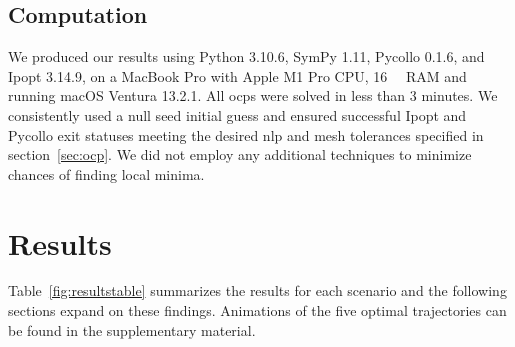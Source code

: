 \documentclass[default,iicol]{sn-jnl}
\begin{document}
\subsection{Computation}
We produced our results using Python 3.10.6, SymPy 1.11, Pycollo 0.1.6, and Ipopt 3.14.9, on a MacBook Pro with Apple M1 Pro CPU, \SI{16}{\giga\byte} RAM and running macOS Ventura 13.2.1.
All \glspl{ocp} were solved in less than 3 minutes.
We consistently used a null seed initial guess and ensured successful Ipopt and Pycollo exit statuses meeting the desired \gls{nlp} and mesh tolerances specified in section~\ref{sec:ocp}. We did not employ any additional techniques to minimize chances of finding local minima.


\section{Results}
%
Table~\ref{fig:resultstable} summarizes the results for each scenario and the following sections expand on these findings. Animations of the five optimal trajectories can be found in the supplementary material.
%
\end{document}
